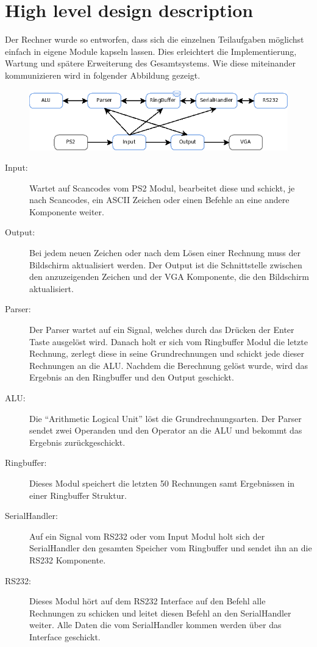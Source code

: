 \section{High level design description}

Der Rechner wurde so entworfen, dass sich die einzelnen Teilaufgaben möglichst einfach in eigene Module
kapseln lassen. Dies erleichtert die Implementierung, Wartung und spätere Erweiterung des Gesamtsystems.
Wie diese miteinander kommunizieren wird in folgender Abbildung gezeigt.

\begin{center}
\begin{figure}[!ht]
 \includegraphics[scale=0.55]{pics/Modules.png}
 \label{fig:Modules}
\end{figure}
\end{center}

\begin{description}
 \item[Input:] Wartet auf Scancodes vom PS2 Modul, bearbeitet diese und schickt, je nach Scancodes, 
ein ASCII Zeichen oder einen Befehle an eine andere Komponente weiter.
 \item[Output:] Bei jedem neuen Zeichen oder nach dem Lösen einer Rechnung muss der Bildschirm aktualisiert werden.
Der Output ist die Schnittstelle zwischen den anzuzeigenden Zeichen und der VGA Komponente, die den Bildschirm 
aktualisiert.
 \item[Parser:] Der Parser wartet auf ein Signal, welches durch das Drücken der Enter Taste ausgelöst wird. Danach holt er sich vom
Ringbuffer Modul die letzte Rechnung, zerlegt diese in seine Grundrechnungen und schickt jede dieser Rechnungen an die ALU.
Nachdem die Berechnung gelöst wurde, wird das Ergebnis an den Ringbuffer und den Output geschickt.
 \item[ALU:] Die ``Arithmetic Logical Unit'' löst die Grundrechnungsarten. Der Parser sendet zwei Operanden und den Operator an die ALU 
und bekommt das Ergebnis zurückgeschickt. 
 \item[Ringbuffer:] Dieses Modul speichert die letzten 50 Rechnungen samt Ergebnissen in einer Ringbuffer Struktur. 
 \item[SerialHandler:] Auf ein Signal vom RS232 oder vom Input Modul holt sich der SerialHandler den gesamten Speicher vom Ringbuffer 
und sendet ihn an die RS232 Komponente.
 \item[RS232:] Dieses Modul hört auf dem RS232 Interface auf den Befehl alle Rechnungen zu schicken und leitet diesen Befehl an den
SerialHandler weiter. Alle Daten die vom SerialHandler kommen werden über das Interface geschickt.
 \end{description}

